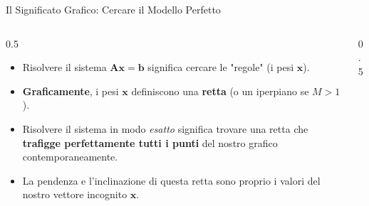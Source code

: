 \documentclass[aspectratio=169, 10pt]{beamer}
\begin{document}
\begin{frame}{Il Significato Grafico: Cercare il Modello Perfetto}
\begin{columns}[T]
    \begin{column}{0.5\textwidth}
        \vspace{0.2cm}
        \begin{itemize}
            \setlength\itemsep{1em}
            \item Risolvere il sistema $\mathbf{A}\mathbf{x} = \mathbf{b}$ significa cercare le "regole" (i pesi $\mathbf{x}$).
            \item \textbf{Graficamente}, i pesi $\mathbf{x}$ definiscono una \textbf{retta} (o un iperpiano se $M>1$).
            \item Risolvere il sistema in modo \emph{esatto} significa trovare una retta che \textbf{trafigge perfettamente tutti i punti} del nostro grafico contemporaneamente.
            \item La pendenza e l'inclinazione di questa retta sono proprio i valori del nostro vettore incognito $\mathbf{x}$.
        \end{itemize}
    \end{column}
    
    \begin{column}{0.5\textwidth}
        \centering
    \end{column}
\end{columns}
\end{frame}
\end{document}
